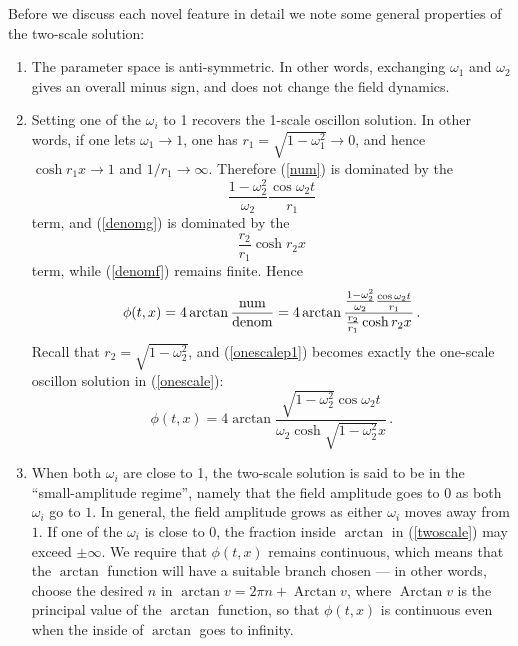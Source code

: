 \documentclass[11pt]{book}
\DeclareMathOperator{\Arctan}{Arctan}
\begin{document}
Before we discuss each novel feature in detail we note some general properties of the two-scale solution:
\begin{enumerate}
\item The parameter space is anti-symmetric. In other words, exchanging $\omega_1$ and $\omega_2$ gives an overall minus sign, and does not change the field dynamics.
\item Setting one of the $\omega_i$ to 1 recovers the 1-scale oscillon solution. In other words, if one lets $\omega_1\to1$, one has $r_1=\sqrt{1-\omega_1^2}\to0$, and hence $\cosh r_1 x\to1$ and $1/r_1 \to \infty$. Therefore (\ref{num}) is dominated by the
  \begin{equation}
    \frac{1-\omega^2_2}{\omega_2}\frac{\cos\omega_2 t}{r_1}
  \end{equation}
  term, and (\ref{denomg}) is dominated by the
  \begin{equation}
    \frac{r_2}{r_1}\cosh r_2 x
  \end{equation}
  term, while (\ref{denomf}) remains finite. Hence
  \begin{equation}\label{onescalep1}
    \phi(t,x) = 4\arctan \frac{\rm num}{\rm denom} = 4\arctan \frac{\frac{1-\omega^2_2}{\omega_2}\frac{\cos\omega_2 t}{r_1}}{\frac{r_2}{r_1}\cosh r_2 x}\,.
  \end{equation}
  Recall that $r_2=\sqrt{1-\omega_2^2}$, and (\ref{onescalep1}) becomes exactly the one-scale oscillon solution in (\ref{onescale}):
  \begin{equation}
    \phi(t,x) = 4\arctan \frac{\sqrt{1-\omega_2^2}\cos\omega_2 t}{\omega_2 \cosh \sqrt{1-\omega_2^2} x}\,.
  \end{equation}

\item When both $\omega_i$ are close to 1, the two-scale solution is said to be in the ``small-amplitude regime'', namely that the field amplitude goes to $0$ as both $\omega_i$ go to $1$. In general, the field amplitude grows as either $\omega_i$ moves away from $1$. If one of the $\omega_i$ is close to 0, the fraction inside $\arctan$ in (\ref{twoscale}) may exceed $\pm\infty$. We require that $\phi(t,x)$ remains continuous, which means that the $\arctan$ function will have a suitable branch chosen --- in other words, choose the desired $n$ in $\arctan v = 2\pi n+ \Arctan v$, where $\Arctan v$ is the principal value of the $\arctan$ function, so that $\phi(t,x)$ is continuous even when the inside of $\arctan$ goes to infinity.
\end{enumerate}
\end{document}
